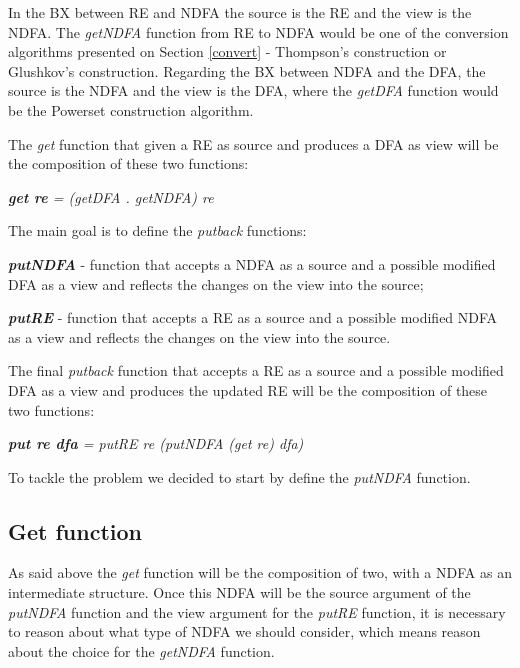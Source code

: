 In the BX between RE and NDFA the source is the RE and the view is the NDFA. The \textit{getNDFA} function from RE to NDFA would be one of the conversion algorithms presented on Section \ref{convert} - Thompson's construction or Glushkov's construction. Regarding the BX between NDFA and the DFA, the source is the NDFA and the view is the DFA, where the \textit{getDFA} function would be the Powerset construction algorithm.

\vspace{5mm}
The \textit{get} function that given a RE as source and produces a DFA as view will be the composition of these two functions:

\begin{center}
    \textit{\textbf{get re} = (getDFA . getNDFA) re}
\end{center}

\vspace{5mm}
The main goal is to define the \textit{putback} functions:

\vspace{3mm}
\textbf{\textit{putNDFA}} - function that accepts a NDFA as a source and a possible modified DFA as a view and reflects the changes on the view into the source;
    
\textbf{\textit{putRE}} - function that accepts a RE as a source and a possible modified NDFA as a view and reflects the changes on the view into the source.

\vspace{5mm}
The final \textit{putback} function that accepts a RE as a source and a possible modified DFA as a view and produces the updated RE will be the composition of these two functions:


\begin{center}
    \textit{\textbf{put re dfa} = putRE re (putNDFA (get re) dfa)}
\end{center}

To tackle the problem we decided to start by define the \textit{putNDFA} function.

\subsection{Get function}
As said above the \textit{get} function will be the composition of two, with a NDFA as an intermediate structure. Once this NDFA will be the source argument of the \textit{putNDFA} function and the view argument for the \textit{putRE} function, it is necessary to reason about what type of NDFA we should consider, which means reason about the choice for the \textit{getNDFA} function.


